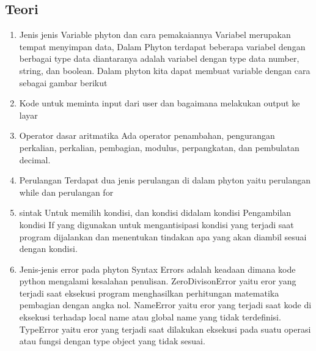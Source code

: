 \begin{enumerate}
\subsection{Teori}
\begin{enumerate}
    \item Jenis jenis Variable phyton dan cara pemakaiannya 
Variabel merupakan tempat menyimpan data, Dalam Phyton terdapat beberapa variabel dengan berbagai type data diantaranya adalah variabel dengan type data number, string, dan boolean. Dalam phyton kita dapat membuat variable dengan cara sebagai gambar berikut
   
    \item Kode untuk meminta input dari user dan bagaimana melakukan output ke layar
 
    \item Operator dasar aritmatika
Ada operator penambahan, pengurangan perkalian, perkalian, pembagian, modulus, perpangkatan, dan pembulatan decimal.

    \item Perulangan
Terdapat dua jenis perulangan di dalam phyton yaitu perulangan while dan perulangan for
 
 
    \item sintak Untuk memilih kondisi, dan kondisi didalam kondisi
Pengambilan kondisi If yang digunakan untuk mengantisipasi kondisi yang terjadi saat program dijalankan dan menentukan tindakan apa yang akan diambil sesuai dengan kondisi.
  
  
  

    \item Jenis-jenis error pada phyton
Syntax Errors adalah keadaan dimana kode python mengalami kesalahan penulisan. 
ZeroDivisonError yaitu eror yang terjadi saat eksekusi program menghasilkan perhitungan matematika pembagian dengan angka nol.
NameError yaitu eror yang terjadi saat kode di eksekusi terhadap local name atau global name yang tidak terdefinisi. 
TypeError yaitu eror yang terjadi saat dilakukan eksekusi pada suatu operasi atau fungsi dengan type object yang tidak sesuai.


\end{enumerate}
\end{enumerate}
